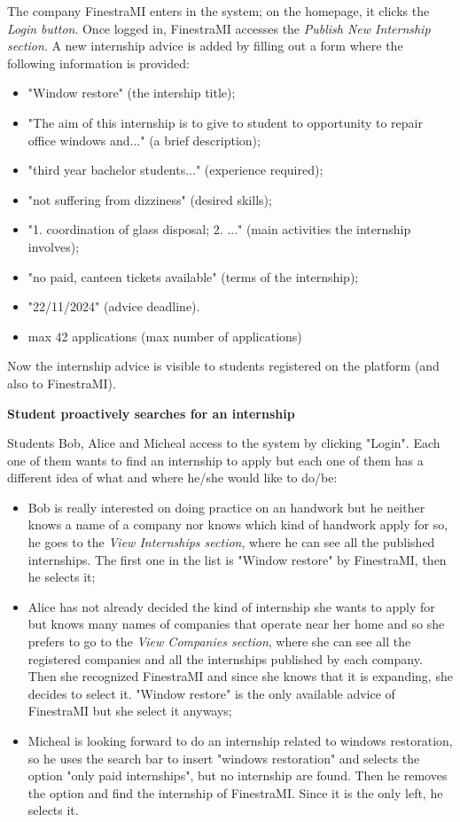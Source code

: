 		\begin{flushleft}
			The company FinestraMI enters in the system; on the homepage, it clicks the \emph{Login button}. Once logged in, FinestraMI accesses the \emph{Publish New Internship section}. A new internship advice is added by filling out a form where the following information is provided:
			\begin{itemize}
				\item "Window restore" (the intership title);
				\item "The aim of this internship is to give to student to opportunity to repair office windows and..." (a brief description);
				\item "third year bachelor students..." (experience required);
				\item "not suffering from dizziness" (desired skills);
				\item "1. coordination of glass disposal; 2. ..." (main activities the internship involves);
				\item "no paid, canteen tickets available" (terms of the internship);
				\item "22/11/2024" (advice deadline).
				\item max 42 applications (max number of applications)				
			\end{itemize}
			
			Now the internship advice is visible to students registered on the platform (and also to FinestraMI).
		\end{flushleft}
		\textbf{Student proactively searches for an internship}
		\begin{flushleft}
			Students Bob, Alice and Micheal access to the system by clicking "Login". Each one of them wants to find an internship to apply but each one of them has a different idea of what and where he/she would like to do/be:
			\begin{itemize}
				\item Bob is really interested on doing practice on an handwork but he neither knows a name of a company nor knows which kind of handwork apply for so, he goes to the \emph{View Internships section}, where he can see all the published internships. The first one in the list is "Window restore" by FinestraMI, then he selects it;
				\item Alice has not already decided the kind of internship she wants to apply for but knows many names of companies that operate near her home and so she prefers to go to the \emph{View Companies section}, where she can see all the registered companies and all the internships published by each company. Then she recognized FinestraMI and since she knows that it is expanding, she decides to select it. "Window restore" is the only available advice of FinestraMI but she select it anyways;
				\item Micheal is looking forward to do an internship related to windows restoration, so he uses the search bar to insert "windows restoration" and selects the option "only paid internships", but no internship are found. Then he removes the option and find the internship of FinestraMI. Since it is the only left, he selects it.
			\end{itemize} 
		\end{flushleft}
